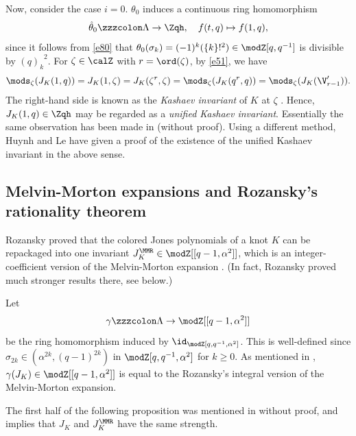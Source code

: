 \documentclass{amsart}
\numberwithin{equation}{section}
\numberwithin{figure}{section}
\theoremstyle{plain}
\theoremstyle{definition}
\theoremstyle{remark}
\begin{document}
Now, consider the case $i=0$.  $\theta _0$ induces a continuous ring
homomorphism
\begin{equation*}
  \hat\theta _0\zzzcolon \Lambda  \rightarrow  \Zqh, \quad f(t,q)\mapsto f(1,q),
\end{equation*}
since it follows from \eqref{e80} that
$\theta _0(\sigma _k)=(-1)^k(\{k\}!^2)\in \modZ [q,q^{-1}]$ is divisible by
${(q)_k}^2$.  For $\zeta \in \calZ$ with $r=\ord(\zeta )$, by \eqref{e51}, we
have
\begin{equation*}
  \mods _\zeta (J_K(1,q))=J_K(1,\zeta )=J_K(\zeta ^r,\zeta )=\mods _\zeta (J_K(q^r,q))
  =\mods _\zeta (J_K(\V'_{r-1})).
\end{equation*}
The right-hand side is known as the {\em Kashaev invariant} of $K$ at
$\zeta $ \cite{Kashaev,Murakami-Murakami}.  Hence, $J_K(1,q)\in \Zqh$ may be
regarded as a {\em unified Kashaev invariant}.  Essentially the same
observation has been made in \cite[Section 3.3]{H:rims2001} (without
proof).  Using a different method, Huynh and Le \cite{Huynh-Le} have
given a proof of the existence of the unified Kashaev invariant in the
above sense.

\subsection{Melvin-Morton expansions and Rozansky's rationality
  theorem}
\label{sec:melv-mort-expans}

Rozansky \cite{Rozansky3} proved that the colored Jones polynomials of
a knot $K$ can be repackaged into one invariant
$J^\MMR_K\in \modZ [[q-1,\alpha ^2]]$, which is an integer-coefficient version of
the Melvin-Morton expansion \cite{Melvin-Morton}.  (In fact, Rozansky
proved much stronger results there, see below.)

Let
\begin{equation*}
  \gamma \zzzcolon \Lambda \rightarrow \modZ [[q-1,\alpha ^2]]
\end{equation*}
be the ring homomorphism induced by $\id_{\modZ [q,q^{-1},\alpha ^2]}$.  This
is well-defined since $\sigma _{2k}\in (\alpha ^{2k},(q-1)^{2k})$ in
$\modZ [q,q^{-1},\alpha ^2]$ for $k\ge 0$.  As mentioned in \cite[Section
3.3]{H:rims2001}, $\gamma (J_K)\in \modZ [[q-1,\alpha ^2]]$ is equal to the Rozansky's
integral version of the Melvin-Morton expansion.

The first half of the following proposition was mentioned in
\cite{H:rims2001} without proof, and implies that $J_K$ and $J^\MMR_K$
have the same strength.
\end{document}
